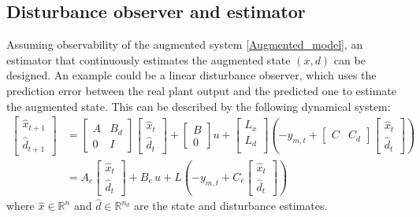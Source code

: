 \documentclass[a4paper,12pt,oneside]{book}
\begin{document}
\subsection*{Disturbance observer and estimator}
Assuming observability of the augmented system \eqref{Augmented_model}, an estimator that continuously estimates the augmented state $(x,d)$ can be designed.
An example could be a linear disturbance observer, which uses the prediction error between the real plant output and the predicted one to estimate the augmented state.
This can be described by the following dynamical system:
\begin{equation}
    \begin{aligned}
    	\begin{bmatrix}
    	   \hat{x}_{t+1} \\
            \hat{d}_{t+1}
        \end{bmatrix}
        &= 
    	\begin{bmatrix}
    		A & B_d \\
    		0 & I
    	\end{bmatrix}
    	\begin{bmatrix}
    		\hat{x}_t \\
    		\hat{d}_t
    	\end{bmatrix}
        +
    	\begin{bmatrix}
    		B \\
    		0
    	\end{bmatrix}
        u +
        \begin{bmatrix}
            L_x \\
            L_d \\
        \end{bmatrix} 
        ( - y_{m,t} +
        \begin{bmatrix}
            C & C_d 
        \end{bmatrix}
        \begin{bmatrix}
            \hat{x}_t \\
            \hat{d}_t
        \end{bmatrix} ) \\
        & = A_e 
        \begin{bmatrix}
        \hat{x}_t \\
        \hat{d}_t
    	\end{bmatrix}
        + 
        B_e \, u +
        L (
         - y_{m,t} +
        C_e
        \begin{bmatrix}
            \hat{x}_t \\
            \hat{d}_t
        \end{bmatrix} )
    \end{aligned}
\label{eq:Estimator_and_observer}
\end{equation}
where $\hat{x} \in \mathbb{R}^n$ and $\hat{d} \in \mathbb{R}^{n_d}$ are the state and disturbance estimates.
\end{document}
